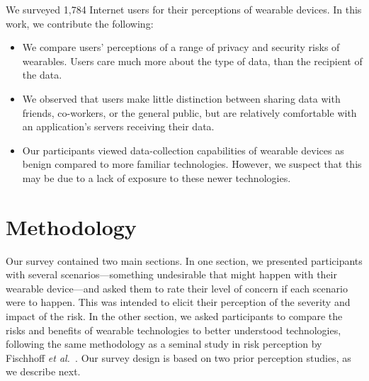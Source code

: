 \documentclass{acm_proc_article-sp}
\def\etal{{\it et al.~}}
\begin{document}
We surveyed 1,784 Internet users for their perceptions of wearable devices. In this work, we contribute the following: \\[-0.8cm]

\begin{itemize} \itemsep1pt \parskip0pt 
\item We compare users' perceptions of a range of privacy and security risks of wearables. Users care much more about the type of data, than the recipient of the data.
\item We observed that users make little distinction between sharing data with friends, co-workers, or the general public, but are relatively comfortable with an application's servers receiving their data.
\item Our participants viewed data-collection capabilities of wearable devices as benign compared to more familiar technologies. However, we suspect that this may be due to a lack of exposure to these newer technologies.
\end{itemize}


\section{Methodology}

Our survey contained two main sections.
In one section, we presented participants with several scenarios---something undesirable that might happen with their wearable device---and asked them to rate their level of concern if each scenario were to happen.
This was intended to elicit their perception of the severity and impact of the risk.
In the other section, we asked participants to compare the risks and benefits of wearable technologies to better understood technologies, following the same methodology as a seminal study in risk perception by Fischhoff \etal \cite{Fischhoff}.
Our survey design is based on two prior perception studies, as we describe next.


\end{document}
